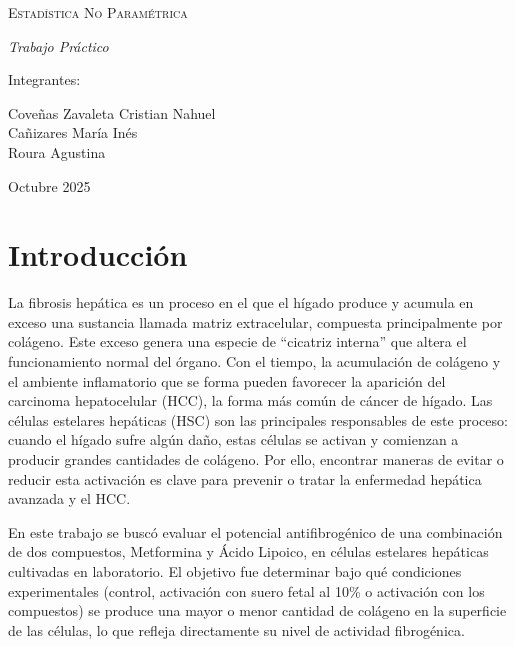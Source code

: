 \documentclass[
  11pt,
]{article}
\author{}
\date{\vspace{-2.5em}}
\begin{document}
\begin{titlepage}
    \centering
     \par 
    \vspace{3cm}
    {\scshape\Huge Estadística No Paramétrica \par}
    \vspace{3cm}
    {\itshape\LARGE Trabajo Práctico  \par}
    \vfill
    {\Large Integrantes: \par}
    {\Large Coveñas Zavaleta Cristian Nahuel\\
            Cañizares María Inés\\
            Roura Agustina \par}
    \vfill
    {\large Octubre 2025 \par}
\end{titlepage}

\section{Introducción}\label{introducciuxf3n}

La fibrosis hepática es un proceso en el que el hígado produce y acumula
en exceso una sustancia llamada matriz extracelular, compuesta
principalmente por colágeno. Este exceso genera una especie de
``cicatriz interna'' que altera el funcionamiento normal del órgano. Con
el tiempo, la acumulación de colágeno y el ambiente inflamatorio que se
forma pueden favorecer la aparición del carcinoma hepatocelular (HCC),
la forma más común de cáncer de hígado. Las células estelares hepáticas
(HSC) son las principales responsables de este proceso: cuando el hígado
sufre algún daño, estas células se activan y comienzan a producir
grandes cantidades de colágeno. Por ello, encontrar maneras de evitar o
reducir esta activación es clave para prevenir o tratar la enfermedad
hepática avanzada y el HCC.

En este trabajo se buscó evaluar el potencial antifibrogénico de una
combinación de dos compuestos, Metformina y Ácido Lipoico, en células
estelares hepáticas cultivadas en laboratorio. El objetivo fue
determinar bajo qué condiciones experimentales (control, activación con
suero fetal al 10\% o activación con los compuestos) se produce una
mayor o menor cantidad de colágeno en la superficie de las células, lo
que refleja directamente su nivel de actividad fibrogénica.
\end{document}
